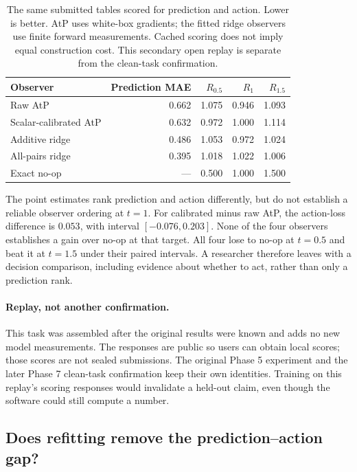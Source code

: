 \begin{table}[H]
\centering
\small
\begin{tabular}{@{}lrrrr@{}}
\toprule
Observer & Prediction MAE & $R_{0.5}$ & $R_1$ & $R_{1.5}$ \\
\midrule
Raw AtP & 0.662 & 1.075 & 0.946 & 1.093 \\
Scalar-calibrated AtP & 0.632 & 0.972 & 1.000 & 1.114 \\
Additive ridge & 0.486 & 1.053 & 0.972 & 1.024 \\
All-pairs ridge & 0.395 & 1.018 & 1.022 & 1.006 \\
Exact no-op & --- & 0.500 & 1.000 & 1.500 \\
\bottomrule
\end{tabular}
\caption{The same submitted tables scored for prediction and action.
Lower is better. AtP uses white-box gradients; the fitted ridge observers use
finite forward measurements. Cached scoring does not imply equal construction
cost. This secondary open replay is separate from the clean-task confirmation.}
\label{tab:ioi-decision-replay}
\end{table}

The point estimates rank prediction and action differently, but do not
establish a reliable observer ordering at $t=1$. For calibrated minus raw AtP,
the action-loss difference is $0.053$, with interval $[-0.076,0.203]$.
None of the four observers establishes a gain over no-op at that target.
All four lose to no-op at $t=0.5$ and beat it at $t=1.5$ under their paired
intervals. A researcher therefore leaves with a decision comparison,
including evidence about whether to act, rather than only a prediction rank.

\paragraph{Replay, not another confirmation.}
This task was assembled after the original results were known and adds no new
model measurements. The responses are public so users can obtain local scores;
those scores are not sealed submissions. The original Phase 5 experiment and
the later Phase 7 clean-task confirmation keep their own identities. Training
on this replay's scoring responses would invalidate a held-out claim, even
though the software could still compute a number.

\subsection{Does refitting remove the prediction--action gap?}
\label{app:ioi-refits}

